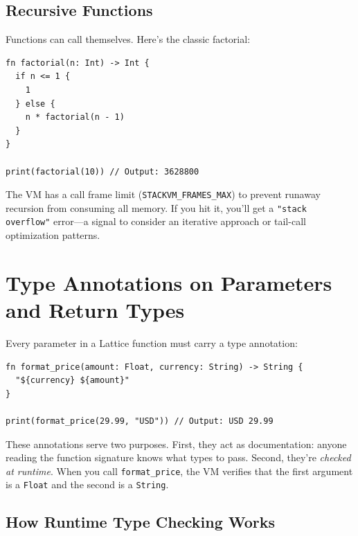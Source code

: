 \subsection{Recursive Functions}\label{sec:recursive-functions}

Functions can call themselves. Here's the classic factorial:

\begin{lstlisting}[language=Lattice, caption={Recursive factorial}]
fn factorial(n: Int) -> Int {
  if n <= 1 {
    1
  } else {
    n * factorial(n - 1)
  }
}

print(factorial(10)) // Output: 3628800
\end{lstlisting}

The VM has a call frame limit (\texttt{STACKVM\_FRAMES\_MAX}) to prevent runaway recursion from consuming all memory. If you hit it, you'll get a \texttt{"stack overflow"} error---a signal to consider an iterative approach or tail-call optimization patterns.

\section{Type Annotations on Parameters and Return Types}\label{sec:type-annotations}

Every parameter in a Lattice function must carry a type annotation:

\begin{lstlisting}[language=Lattice, caption={Type annotations}]
fn format_price(amount: Float, currency: String) -> String {
  "${currency} ${amount}"
}

print(format_price(29.99, "USD")) // Output: USD 29.99
\end{lstlisting}

These annotations serve two purposes. First, they act as documentation: anyone reading the function signature knows what types to pass. Second, they're \emph{checked at runtime}. When you call \lstinline|format_price|, the VM verifies that the first argument is a \lstinline|Float| and the second is a \lstinline|String|.

\subsection{How Runtime Type Checking Works}\label{sec:runtime-type-checking}

